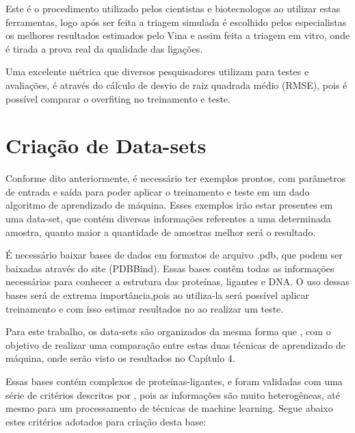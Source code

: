 \documentclass[tcc, capa]{texucpel}
\begin{document}
Este é o procedimento utilizado pelos cientistas e biotecnologos ao utilizar estas ferramentas, logo após ser feita a triagem simulada é escolhido pelos especialistas os melhores resultados estimados pelo Vina e assim feita a triagem em vitro, onde é tirada a prova real da qualidade das ligações.

Uma excelente métrica que diversos pesquisadores utilizam para testes e avaliações, é através do cálculo de desvio de raiz quadrada médio (RMSE), pois é possível comparar o overfiting no treinamento e teste.

\section{Criação de Data-sets}
Conforme dito anteriormente, é necessário ter exemplos prontos, com parâmetros de entrada e saída para poder aplicar o treinamento e teste em um dado algoritmo de aprendizado de máquina.
Esses exemplos irão estar presentes em uma data-set, que contém diversas informações referentes a uma determinada amostra, quanto maior a quantidade de amostras melhor será o resultado.

É necessário baixar bases de dados em formatos de arquivo .pdb, que podem ser baixadas através do site (PDBBind). Essas bases contêm todas as informações necessárias para conhecer a estrutura das proteínas, ligantes e DNA. 
O uso dessas bases será de extrema importância,pois ao utiliza-la será possível aplicar treinamento e com isso estimar resultados no ao realizar um teste. 

Para este trabalho, os data-sets são organizados da mesma forma que \cite{ballester2010machine}, com o objetivo de realizar uma comparação entre estas duas técnicas de aprendizado de máquina, onde serão visto os resultados no Capítulo 4.

Essas bases contém complexos de proteínas-ligantes, e foram validadas com uma série de critérios descritos por \cite{cheng2009comparative}, pois as informações são muito heterogêneas, até mesmo para um processamento de técnicas de machine learning. 
Segue abaixo estes critérios adotados para criação desta base:
\end{document}
